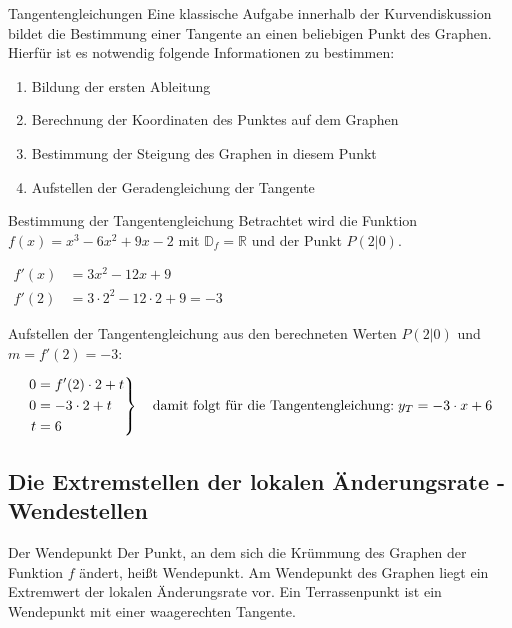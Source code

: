 \begin{bem}{Tangentengleichungen}{}
Eine klassische Aufgabe innerhalb der Kurvendiskussion bildet die Bestimmung einer Tangente an einen beliebigen Punkt des Graphen. Hierfür ist es notwendig folgende Informationen zu bestimmen:
\begin{enumerate}
    \item Bildung der ersten Ableitung
    \item Berechnung der Koordinaten des Punktes auf dem Graphen
    \item Bestimmung der Steigung des Graphen in diesem Punkt
    \item Aufstellen der Geradengleichung der Tangente
\end{enumerate}
\end{bem}
\label{Tangentengleichung}
\begin{bsp}{Bestimmung der Tangentengleichung}{}
  Betrachtet wird die Funktion $f(x)= x^3 -6x^2 +9x -2$ mit $\mathds{D}_f = \mathds{R}$ und der Punkt $P(2|0)$.
 \begin{center}$\begin{aligned}
	f'(x)&= 3x^2 -12x +9\\
    f'(2) &= 3\cdot 2^2 -12 \cdot 2 +9 = -3
	\end{aligned}$\end{center} 
 Aufstellen der Tangentengleichung aus den berechneten Werten $P(2|0)$ und $m= f'(2) = -3$: 

\begin{equation*}
	\left.\begin{aligned}
	0 &=  f'(2) \cdot 2 + t \\
	0 &= -3 \cdot 2 +t\\
    t &=6
	\end{aligned}
	\right\}
\quad \text{damit folgt für die Tangentengleichung:}\hspace{0.1cm } y_T = -3\cdot x +6 
\end{equation*}
\end{bsp}
\subsection{Die Extremstellen der lokalen Änderungsrate - Wendestellen}  
\begin{defi}{Der Wendepunkt}{}
Der Punkt, an dem sich die Krümmung des Graphen der Funktion $f$ ändert, heißt Wendepunkt. Am Wendepunkt des Graphen liegt ein Extremwert der lokalen Änderungsrate vor. Ein Terrassenpunkt ist ein Wendepunkt mit einer waagerechten Tangente.
\end{defi}

